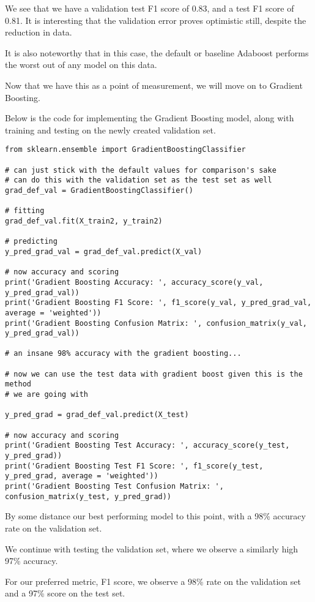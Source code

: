 \documentclass[12pt, letterpaper]{article}
\begin{document}
We see that we have a validation test F1 score of 0.83, and a test F1 score of 0.81. It is interesting that the validation error proves optimistic still, despite the reduction in data. 

It is also noteworthy that in this case, the default or baseline Adaboost performs the worst out of any model on this data. 

Now that we have this as a point of measurement, we will move on to Gradient Boosting. 

Below is the code for implementing the Gradient Boosting model, along with training and testing on the newly created validation set. 

\begin{verbatim}
from sklearn.ensemble import GradientBoostingClassifier 

# can just stick with the default values for comparison's sake 
# can do this with the validation set as the test set as well 
grad_def_val = GradientBoostingClassifier() 

# fitting 
grad_def_val.fit(X_train2, y_train2) 

# predicting 
y_pred_grad_val = grad_def_val.predict(X_val) 

# now accuracy and scoring 
print('Gradient Boosting Accuracy: ', accuracy_score(y_val, y_pred_grad_val)) 
print('Gradient Boosting F1 Score: ', f1_score(y_val, y_pred_grad_val, average = 'weighted')) 
print('Gradient Boosting Confusion Matrix: ', confusion_matrix(y_val, y_pred_grad_val)) 

# an insane 98% accuracy with the gradient boosting...

# now we can use the test data with gradient boost given this is the method 
# we are going with 

y_pred_grad = grad_def_val.predict(X_test) 

# now accuracy and scoring 
print('Gradient Boosting Test Accuracy: ', accuracy_score(y_test, y_pred_grad)) 
print('Gradient Boosting Test F1 Score: ', f1_score(y_test, y_pred_grad, average = 'weighted')) 
print('Gradient Boosting Test Confusion Matrix: ', confusion_matrix(y_test, y_pred_grad))
\end{verbatim}

By some distance our best performing model to this point, with a 98\% accuracy rate on the validation set. 

We continue with testing the validation set, where we observe a similarly high 97\% accuracy. 

For our preferred metric, F1 score, we observe a 98\% rate on the validation set and a 97\% score on the test set. 
\end{document}
